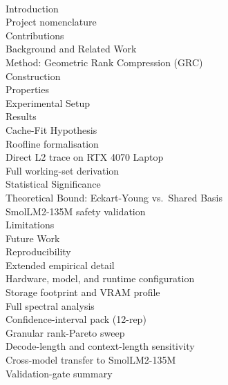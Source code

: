 \documentclass[11pt]{article}
\begin{document}
\\
\quad Introduction\\
\quad \quad Project nomenclature\\
\quad \quad Contributions\\
\quad Background and Related Work\\
\quad Method: Geometric Rank Compression (GRC)\\
\quad \quad Construction\\
\quad \quad Properties\\
\quad Experimental Setup\\
\quad Results\\
\quad Cache-Fit Hypothesis\\
\quad \quad Roofline formalisation\\
\quad \quad Direct L2 trace on RTX 4070 Laptop\\
\quad \quad Full working-set derivation\\
\quad Statistical Significance\\
\quad Theoretical Bound: Eckart-Young vs.\ Shared Basis\\
\quad \quad SmolLM2-135M safety validation\\
\quad Limitations\\
\quad Future Work\\
\quad Reproducibility\\
\quad Extended empirical detail\\
\quad \quad Hardware, model, and runtime configuration\\
\quad \quad Storage footprint and VRAM profile\\
\quad \quad Full spectral analysis\\
\quad \quad Confidence-interval pack (12-rep)\\
\quad \quad Granular rank-Pareto sweep\\
\quad \quad Decode-length and context-length sensitivity\\
\quad \quad Cross-model transfer to SmolLM2-135M\\
\quad \quad Validation-gate summary\\
\end{document}
